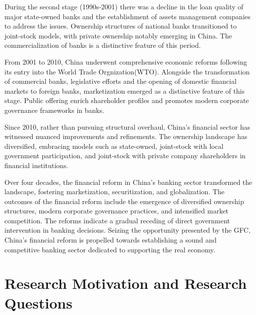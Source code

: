 \documentclass[
  12pt,
  a4paper,
  DIV=11,
  numbers=noendperiod]{scrreprt}
\begin{document}
During the second stage (1990s-2001) there was a decline in the loan
quality of major state-owned banks and the establishment of assets
management companies to address the issues. Ownership structures of
national banks transitioned to joint-stock models, with private
ownership notably emerging in China. The commercialization of banks is a
distinctive feature of this period.

From 2001 to 2010, China underwent comprehensive economic reforms
following its entry into the World Trade Orgnization(WTO). Alongside the
transformation of commercial banks, legislative efforts and the opening
of domestic financial markets to foreign banks, marketization emerged as
a distinctive feature of this stage. Public offering enrich shareholder
profiles and promotes modern corporate governance frameworks in banks.

Since 2010, rather than pursuing structural overhaul, China's financial
sector has witnessed nuanced improvements and refinements. The ownership
landscape has diversified, embracing models such as state-owned,
joint-stock with local government participation, and joint-stock with
private company shareholders in financial institutions.

Over four decades, the financial reform in China's banking sector
transformed the landscape, fostering marketization, securitization, and
globalization. The outcomes of the financial reform include the
emergence of diversified ownership structures, modern corporate
governance practices, and intensified market competition. The reforms
indicate a gradual receding of direct government intervention in banking
decisions. Seizing the opportunity presented by the GFC, China's
financial reform is propelled towards establishing a sound and
competitive banking sector dedicated to supporting the real economy.

\section{Research Motivation and Research
Questions}\label{research-motivation-and-research-questions}
\end{document}
